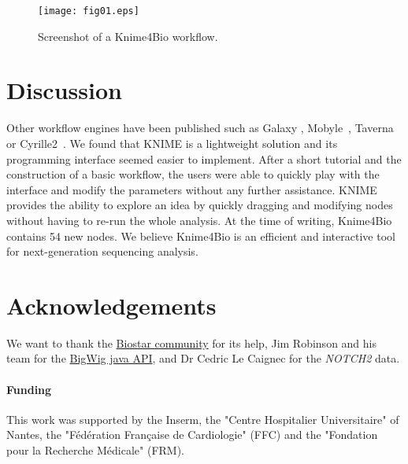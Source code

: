 \documentclass{bioinfo}
\begin{document}
\begin{figure}[!tpb]%
\centerline{\texttt{[image: fig01.eps]}}
\caption{Screenshot of a Knime4Bio workflow.}\label{fig:x1}
\end{figure}

\section{Discussion}

Other workflow engines have been published such as Galaxy \citep{pmid21531983}, Mobyle~\citep{pmid19689959}, Taverna~\citep{pmid16845108} or Cyrille2~\citep{pmid18269742}. We found that KNIME is a lightweight solution and its programming interface seemed easier to implement. After a short tutorial and the construction of a basic workflow, the users were able to quickly play with the interface and modify the parameters without any further assistance. KNIME provides the ability to explore an idea by quickly dragging and modifying nodes without having to re-run the whole analysis. At the time of writing, Knime4Bio contains 54 new nodes. We believe Knime4Bio is an efficient and interactive tool for next-generation sequencing analysis.


\section*{Acknowledgements}
We want to thank the  \href{http://biostar.stackexchange.com/}{Biostar community} for its help, Jim Robinson and his team for the \href{http://code.google.com/p/bigwig/}{BigWig java API}, and Dr Cedric Le Caignec for the \textit{NOTCH2} data.

\paragraph{Funding\textcolon} This work was supported by the Inserm, the "Centre Hospitalier Universitaire" of Nantes, the "F\'{e}d\'{e}ration Fran\c{c}aise de Cardiologie" (FFC) and the "Fondation pour la Recherche M\'{e}dicale" (FRM).
\\



\end{document}
